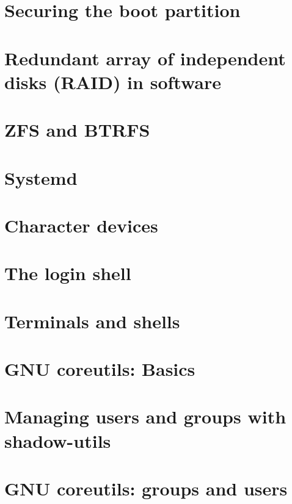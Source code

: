 \documentclass[oneside]{book}
\begin{document}
\part{Securing the boot partition}



\part{Redundant array of independent disks (RAID) in software}


\part{ZFS and BTRFS}



\part{Systemd}


\part{Character devices}




\part{The login shell}

\part{Terminals and shells}





\part{GNU coreutils: Basics}






\part{Managing users and groups with shadow-utils}




\part{GNU coreutils: groups and users}

\end{document}
